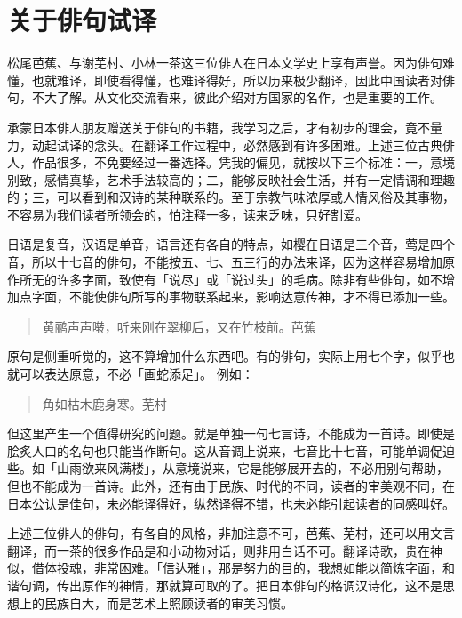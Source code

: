{    \section*{\FS 关于俳句试译}

    松尾芭蕉、与谢芜村、小林一茶这三位俳人在日本文学史上享有声誉。因为俳句难懂，也就难译，即使看得懂，也难译得好，所以历来极少翻译，因此中国读者对俳句，不大了解。从文化交流看来，彼此介绍对方国家的名作，也是重要的工作。

    承蒙日本俳人朋友赠送关于俳句的书籍，我学习之后，才有初步的理会，竟不量力，动起试译的念头。在翻译工作过程中，必然感到有许多困难。上述三位古典俳人，作品很多，不免要经过一番选择。凭我的偏见，就按以下三个标准：一，意境别致，感情真挚，艺术手法较高的；二，能够反映社会生活，并有一定情调和理趣的；三，可以看到和汉诗的某种联系的。至于宗教气味浓厚或人情风俗及其事物，不容易为我们读者所领会的，怕注释一多，读来乏味，只好割爱。

    日语是复音，汉语是单音，语言还有各自的特点，如樱在日语是三个音，莺是四个音，所以十七音的俳句，不能按五、七、五三行的办法来译，因为这样容易增加原作所无的许多字面，致使有「说尽」或「说过头」的毛病。除非有些俳句，如不增加点字面，不能使俳句所写的事物联系起来，影响达意传神，才不得已添加一些。

    \begin{quote}
        黄鹂声声啭，听来刚在翠柳后，又在竹枝前。\hfill 芭蕉
    \end{quote}

    原句是侧重听觉的，这不算增加什么东西吧。有的俳句，实际上用七个字，似乎也就可以表达原意，不必「画蛇添足」。 例如：

    \begin{quote}
        角如枯木鹿身寒。\hfill 芜村
    \end{quote}

    但这里产生一个值得研究的问题。就是单独一句七言诗，不能成为一首诗。即使是脍炙人口的名句也只能当作断句。这从音调上说来，七音比十七音，可能单调促迫些。如「山雨欲来风满楼」，从意境说来，它是能够展开去的，不必用别句帮助，但也不能成为一首诗。此外，还有由于民族、时代的不同，读者的审美观不同，在日本公认是佳句，未必能译得好，纵然译得不错，也未必能引起读者的同感叫好。

    上述三位俳人的俳句，有各自的风格，非加注意不可，芭蕉、芜村，还可以用文言翻译，而一茶的很多作品是和小动物对话，则非用白话不可。翻译诗歌，贵在神似，借体投魂，非常困难。「信达雅」，那是努力的目的，我想如能以简炼字面，和谐句调，传出原作的神情，那就算可取的了。把日本俳句的格调汉诗化，这不是思想上的民族自大，而是艺术上照顾读者的审美习惯。

}
